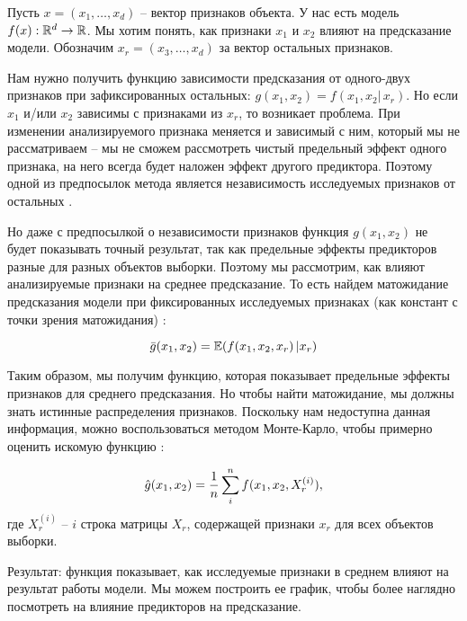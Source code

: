 Пусть $x = (x_1, \ldots, x_d)$ -- вектор признаков объекта. У нас есть модель $f(x): \mathbb{R}^d \rightarrow \mathbb{R}$. Мы хотим понять, как признаки $x_1$ и $x_2$ влияют на предсказание модели. Обозначим $x_r = (x_3, \ldots, x_d)$ за вектор остальных признаков.

Нам нужно получить функцию зависимости предсказания от одного-двух признаков при зафиксированных остальных: $g(x_1, x_2) = f(x_1, x_2 | \, x_r)$. %
Но если $x_1$ и/или $x_2$ зависимы с признаками из $x_r$, то возникает проблема. При изменении анализируемого признака меняется и зависимый с ним, который мы не рассматриваем -- мы не сможем рассмотреть чистый предельный эффект одного признака, на него всегда будет наложен эффект другого предиктора. Поэтому одной из предпосылок метода является независимость исследуемых признаков от остальных \cite{pdp}.

Но даже с предпосылкой о независимости признаков функция $g(x_1, x_2)$ не будет показывать точный результат, так как предельные эффекты предикторов разные для разных объектов выборки. Поэтому мы рассмотрим, как влияют анализируемые признаки на среднее предсказание. То есть найдем матожидание предсказания модели при фиксированных исследуемых признаках (как констант с точки зрения матожидания) \cite{pdp}:

\[
\bar{g}(x_1, x_2) = \mathbb{E}(f(x_1, x_2, x_r) \, | x_r)
\]

Таким образом, мы получим функцию, которая показывает предельные эффекты признаков для среднего предсказания. Но чтобы найти матожидание, мы должны знать истинные распределения признаков. Поскольку нам недоступна данная информация, можно воспользоваться методом Монте-Карло, чтобы примерно оценить искомую функцию \cite{basis}:

\[
\hat{g}(x_1, x_2) = \frac{1}{n} \sum\limits_i^n f(x_1, x_2, X_r^{(i)}),
\]
где $X_r^{(i)}$ -- $i$ строка матрицы $X_r$, содержащей признаки $x_r$ для всех объектов выборки.

Результат: функция показывает, как исследуемые признаки в среднем влияют на результат работы модели. Мы можем построить ее график, чтобы более наглядно посмотреть на влияние предикторов на предсказание.%

